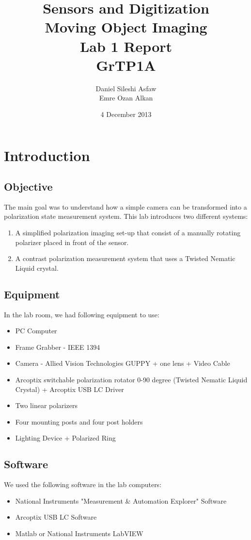 \documentclass{article}
\title{Sensors and Digitization\\
		Moving Object Imaging\\
		Lab 1 Report\\
		GrTP1A}
\author{Daniel Sileshi Asfaw\\
		Emre Ozan Alkan\\}
\date{4 December 2013}
\begin{document}
\maketitle

\section{Introduction}
	\subsection{Objective}
	The main goal was to understand how a simple camera can be transformed into a polarization state measurement system. This lab introduces two different systems:
	\begin{enumerate}
	\item A simplified polarization imaging set-up that consist of a manually rotating polarizer placed in front of the sensor.
	\item A contrast polarization measurement system that uses a Twisted Nematic Liquid crystal.
	\end{enumerate}

	\subsection{Equipment}
	In the lab room, we had following equipment to use:
	\begin{itemize}
		\item PC Computer
		\item Frame Grabber - IEEE 1394
		\item Camera - Allied Vision Technologies GUPPY + one lens + Video Cable
		\item Arcoptix switchable polarization rotator 0-90 degree (Twisted Nematic Liquid Crystal) + Arcoptix USB LC Driver
		\item Two linear polarizers
		\item Four mounting posts and four post holders
		\item Lighting Device + Polarized Ring
	\end{itemize}		
	
	\subsection{Software}
	We used the following software in the lab computers:
	\begin{itemize}
		\item National Instruments "Measurement \& Automation Explorer" Software
		\item Arcoptix USB LC Software
		\item Matlab or National Instruments LabVIEW
	\end{itemize}
	
\end{document}

